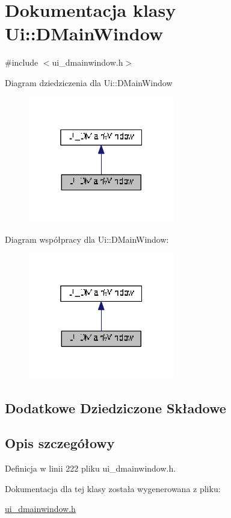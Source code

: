 \hypertarget{class_ui_1_1_d_main_window}{}\section{Dokumentacja klasy Ui\+:\+:D\+Main\+Window}
\label{class_ui_1_1_d_main_window}


{\ttfamily \#include $<$ui\+\_\+dmainwindow.\+h$>$}



Diagram dziedziczenia dla Ui\+:\+:D\+Main\+Window\nopagebreak
\begin{figure}[H]
\begin{center}
\leavevmode
\includegraphics[width=181pt]{class_ui_1_1_d_main_window__inherit__graph}
\end{center}
\end{figure}


Diagram współpracy dla Ui\+:\+:D\+Main\+Window\+:\nopagebreak
\begin{figure}[H]
\begin{center}
\leavevmode
\includegraphics[width=181pt]{class_ui_1_1_d_main_window__coll__graph}
\end{center}
\end{figure}
\subsection*{Dodatkowe Dziedziczone Składowe}


\subsection{Opis szczegółowy}


Definicja w linii 222 pliku ui\+\_\+dmainwindow.\+h.



Dokumentacja dla tej klasy została wygenerowana z pliku\+:\begin{DoxyCompactItemize}
\item 
\hyperlink{ui__dmainwindow_8h}{ui\+\_\+dmainwindow.\+h}\end{DoxyCompactItemize}
